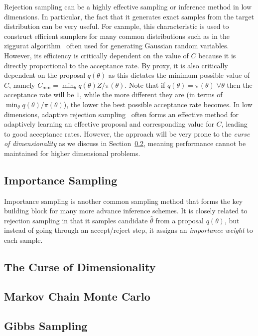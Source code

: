 Rejection sampling can be a highly effective sampling or inference method in low dimensions.
In particular, the fact that it generates exact samples from the target distribution can be very
useful.  For example, this characteristic is used to construct efficient samplers for many 
common distributions such as in the ziggurat algorithm~\citep{marsaglia2000ziggurat} often
used for generating Gaussian random variables.  However, its efficiency is critically dependent
on the value of $C$ because it is directly proportional to the acceptance rate.  By proxy, it
is also critically dependent on the proposal $q(\theta)$ as this dictates the minimum possible
value of $C$, namely $C_{\min} = \min_{\theta} q(\theta) Z / \pi(\theta)$.  Note that if 
$q(\theta) = \pi(\theta) \; \forall \theta$ then the acceptance rate will be $1$, while the
more different they are (in terms of $\min_{\theta} q(\theta) / \pi(\theta)$), the lower the
best possible acceptance rate becomes.  In low dimensions, adaptive rejection 
sampling~\citep{gilks1992adaptive} often forms an effective method for adaptively 
learning an effective proposal and corresponding value for $C$, leading to good acceptance
rates.  However, the approach will be very prone to the \emph{curse of dimensionality} as
we discuss in Section~\ref{sec:inf:foundation:curse}, meaning performance cannot be
maintained for higher dimensional problems.

\subsection{Importance Sampling}
\label{sec:inf:foundation:importance}

Importance sampling is another common sampling method that forms the key building block
for many more advance inference schemes.  It is closely related to rejection sampling in that
it samples candidate $\hat{\theta}$ from a proposal $q(\theta)$, but instead of going
through an accept/reject step, it assigns an \emph{importance weight} to each sample.

\subsection{The Curse of Dimensionality}
\label{sec:inf:foundation:curse}


\subsection{Markov Chain Monte Carlo}
\label{sec:inf:foundation:mcmc}

\subsection{Gibbs Sampling}
\label{sec:inf:foundation:gibbs}